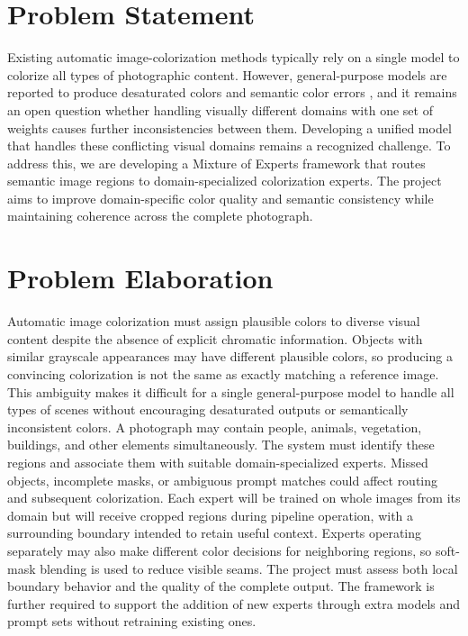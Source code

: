 \documentclass{FastFyp}
\begin{document}
\section{Problem Statement}
Existing automatic image-colorization methods typically rely on a single model to colorize all types of photographic content. However, general-purpose models are reported to produce desaturated colors \cite{ref1,ref6} and semantic color errors \cite{ref9}, and it remains an open question whether handling visually different domains with one set of weights causes further inconsistencies between them. Developing a unified model that handles these conflicting visual domains remains a recognized challenge. To address this, we are developing a Mixture of Experts framework that routes semantic image regions to domain-specialized colorization experts. The project aims to improve domain-specific color quality and semantic consistency while maintaining coherence across the complete photograph.
\section{Problem Elaboration}
Automatic image colorization must assign plausible colors to diverse visual content despite the absence of explicit chromatic information. Objects with similar grayscale appearances may have different plausible colors, so producing a convincing colorization is not the same as exactly matching a reference image. This ambiguity makes it difficult for a single general-purpose model to handle all types of scenes without encouraging desaturated outputs or semantically inconsistent colors. A photograph may contain people, animals, vegetation, buildings, and other elements simultaneously. The system must identify these regions and associate them with suitable domain-specialized experts. Missed objects, incomplete masks, or ambiguous prompt matches could affect routing and subsequent colorization. Each expert will be trained on whole images from its domain but will receive cropped regions during pipeline operation, with a surrounding boundary intended to retain useful context. Experts operating separately may also make different color decisions for neighboring regions, so soft-mask blending is used to reduce visible seams. The project must assess both local boundary behavior and the quality of the complete output. The framework is further required to support the addition of new experts through extra models and prompt sets without retraining existing ones.
\end{document}
